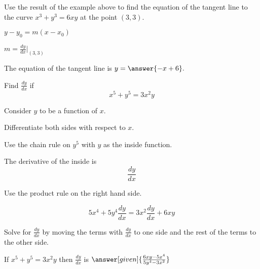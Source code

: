 \documentclass{ximera}
\begin{document}
\begin{center}
\begin{foldable}
\end{foldable}
\end{center}


\begin{problem}
Use the result of the example above to find the equation of the tangent line to the curve $x^3 + y^3 = 6xy$ at the point $(3,3).$

\begin{hint}
$y-y_0 = m(x-x_0)$
\end{hint}
\begin{hint}
$m = \frac{dy}{dx}\bigg|_{(3,3)}$
\end{hint}
The equation of the tangent line is $y = \answer{-x + 6}.$
\end{problem}




\begin{problem} %
  Find $\frac{dy}{dx}$ if
  \[
  x^5 + y^5 = 3x^2y
  \]
  
	  
    \begin{hint}
      Consider $y$ to be a function of $x$.
    \end{hint}
		\begin{hint}
		  Differentiate both sides with respect to $x$.
		\end{hint}
    \begin{hint}
      Use the chain rule on $y^5$ with $y$ as the inside function.
    \end{hint}
    \begin{hint}
      The derivative of the inside is 
      \[
      \frac{dy}{dx}
      \]
    \end{hint}
		\begin{hint}
      Use the product rule on the right hand side.
    \end{hint}
		\begin{hint}
		  \[
			5x^4 + 5y^4\frac{dy}{dx} = 3x^2\frac{dy}{dx} + 6xy
			\]
		\end{hint}
		\begin{hint}
		  Solve for $\frac{dy}{dx}$ by moving the terms with $\frac{dy}{dx}$ 
			to one side and the 
			rest of the terms to the other side.
		\end{hint}
    
		If $x^5 + y^5 = 3x^2y$ then $\frac{dy}{dx}$ is
		 $\answer[given]{\frac{6xy - 5x^4}{5y^4 - 3x^2}}$
		
\end{problem}
\end{document}
